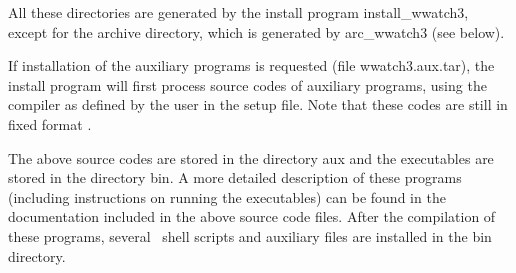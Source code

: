 \noindent
All these directories are generated by the install program {\file
install\_wwatch3}, except for the archive directory, which is generated by
{\file arc\_wwatch3} (see below).

If installation of the auxiliary programs is requested (file {\file
wwatch3.aux.tar}), the install program will first process source codes of
auxiliary programs, using the compiler as defined by the user in the setup
file. Note that these codes are still in fixed format .

\begin{flist}


\end{flist}

\noindent
The above source codes are stored in the directory {\dir aux} and the
executables are stored in the directory {\dir bin}. A more detailed
description of these programs (including instructions on running the
executables) can be found in the documentation included in the above source
code files. After the compilation of these programs, several \unix\ shell
scripts and auxiliary files are installed in the {\dir bin} directory.

